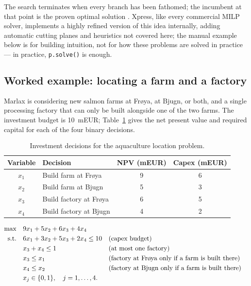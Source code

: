 The search terminates when every branch has been fathomed; the incumbent
at that point is the proven optimal solution
\citep{landdoig1960}. Xpress, like every commercial MILP solver,
implements a highly refined version of this idea internally, adding
automatic cutting planes and heuristics not covered here; the manual
example below is for building intuition, not for how these problems are
solved in practice --- in practice, \texttt{p.solve()} is enough.

\subsection{Worked example: locating a farm and a factory}
\label{sec:bnb-example}

Marlax is considering new salmon farms at Fr{\o}ya, at Bjugn, or both, and
a single processing factory that can only be built alongside one of the
two farms. The investment budget is 10~mEUR; Table~\ref{tab:aqua-data}
gives the net present value and required capital for each of the four
binary decisions.

\begin{table}[htbp]
\centering
\caption{Investment decisions for the aquaculture location problem.}
\label{tab:aqua-data}
\begin{tabular}{@{}clcc@{}}
\toprule
Variable & Decision & NPV (mEUR) & Capex (mEUR) \\
\midrule
$x_1$ & Build farm at Fr{\o}ya & 9 & 6 \\
$x_2$ & Build farm at Bjugn & 5 & 3 \\
$x_3$ & Build factory at Fr{\o}ya & 6 & 5 \\
$x_4$ & Build factory at Bjugn & 4 & 2 \\
\bottomrule
\end{tabular}
\end{table}

\begin{align}
  \max \quad & 9x_1+5x_2+6x_3+4x_4 \label{eq:aqua}\\
  \text{s.t.} \quad & 6x_1+3x_2+5x_3+2x_4 \leq 10 && \text{(capex budget)} \notag\\
  & x_3+x_4 \leq 1 && \text{(at most one factory)} \notag\\
  & x_3 \leq x_1 && \text{(factory at Fr\o ya only if a farm is built there)} \notag\\
  & x_4 \leq x_2 && \text{(factory at Bjugn only if a farm is built there)} \notag\\
  & x_j \in \{0,1\}, \quad j=1,\ldots,4. \notag
\end{align}

